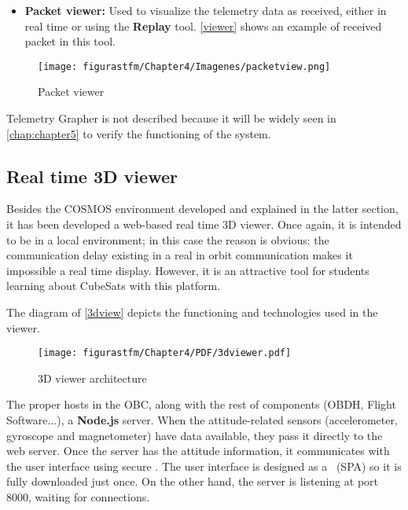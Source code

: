 \begin{itemize} [noitemsep,topsep=0pt]
	\item \textbf{Packet viewer:} Used to visualize the telemetry data as received, either in real time or using the \textbf{Replay} tool. \autoref{viewer} shows an example of received packet in this tool.
\end{itemize}

\begin{figure} [H]
			\centering
			\texttt{[image: figurastfm/Chapter4/Imagenes/packetview.png]}
			\caption{Packet viewer} \label{viewer}
\end{figure}

Telemetry Grapher is not described because it will be widely seen in \autoref{chap:chapter5} to verify the functioning of the system.

\subsection{Real time 3D viewer}

Besides the COSMOS environment developed and explained in the latter section, it has been developed a web-based real time 3D viewer. Once again, it is intended to be in a local environment; in this case the reason is obvious: the communication delay existing in a real in orbit communication makes it impossible a real time display. However, it is an attractive tool for students learning about CubeSats with this platform. 

The diagram of \autoref{3dview} depicts the functioning and technologies used in the viewer.

\begin{figure} [H]
			\centering
			\texttt{[image: figurastfm/Chapter4/PDF/3dviewer.pdf]}
			\caption{3D viewer architecture} \label{3dview}
\end{figure}

The proper  hosts in the \acrshort{OBC}, along with the rest of components (\acrshort{OBDH}, Flight Software...), a \textbf{Node.js} \cite{nodejs} server. When the attitude-related sensors (accelerometer, gyroscope and magnetometer) have data available, they pass it directly to the web server. Once the server has the attitude information, it communicates with the user interface using secure . The user interface is designed as a ~(\acrshort{SPA}) so it is fully downloaded just once. On the other hand, the server is listening at port 8000, waiting for connections.

